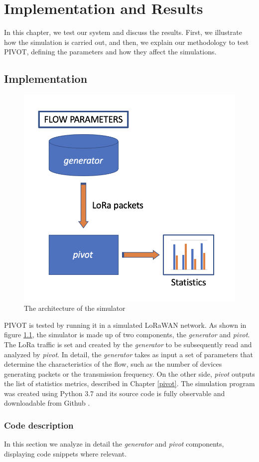 \chapter{Implementation and Results}
\label{implementation}
In this chapter, we test our system and discuss the results. First, we illustrate how the simulation is carried out, and then, we explain our methodology to test PIVOT, defining the parameters and how they affect the simulations. 

\section{Implementation}
\label{simulator}
\begin{figure}[H]
    \centering
    \includegraphics[width=0.5\linewidth]{images/implementation/simulator.png}
    \caption{The architecture of the simulator}
    \label{fig:simulator}
\end{figure}
PIVOT is tested by running it in a simulated LoRaWAN network. As shown in figure \ref{fig:simulator}, the simulator is made up of two components, the \textit{generator} and \textit{pivot}. The LoRa traffic is set and created by the \textit{generator} to be subsequently read and analyzed by \textit{pivot}. In detail, the \textit{generator} takes as input a set of parameters that determine the characteristics of the flow, such as the number of devices generating packets or the transmission frequency. On the other side, \textit{pivot} outputs the list of statistics metrics, described in Chapter \ref{pivot}. The simulation program was created using Python 3.7 and its source code is fully observable and downloadable from Github \cite{terenzi}.

\subsection{Code description}
In this section we analyze in detail the \textit{generator} and \textit{pivot} components, displaying code snippets where relevant.

